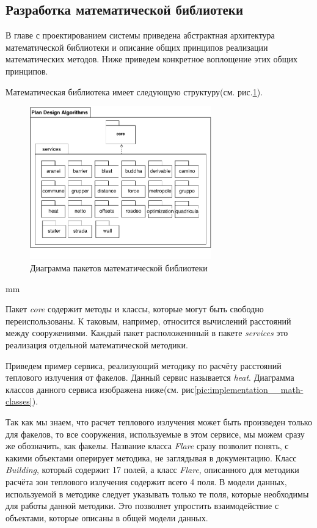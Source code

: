 \subsection{\large{Разработка математической библиотеки}}

В главе с проектированием системы приведена абстрактная архитектура математической библиотеки
и описание общих принципов реализации математических методов. Ниже приведем конкретное воплощение этих общих принципов.

Математическая библиотека имеет следующую структуру(см. рис.\ref{pic:implementation__math-packages}).

\begin{figure}[H]
	\includegraphics[width=0.7\textwidth]{implementation/pictures/math/packages}
	\caption{Диаграмма пакетов математической библиотеки}
	\label{pic:implementation__math-packages}
\end{figure}
 mm

Пакет \textit{core} содержит методы и классы, которые могут быть свободно переиспользованы.
К таковым, например, относится вычислений расстояний между сооружениями.
Каждый пакет расположеннный в пакете \textit{services} это реализация отдельной математической методики.

Приведем пример сервиса, реализующий
методику по расчёту расстояний теплового излучения от факелов. Данный сервис называется \textit{heat}.
Диаграмма классов данного сервиса изображена ниже(см. рис\ref{pic:implementation__math-classes}).

Так как мы знаем, что расчет теплового излучения может быть произведен только для факелов, то все сооружения,
используемые в этом сервисе, мы можем сразу же обозначить, как факелы. Название класса \textit{Flare} сразу позволит
понять, с какими объектами оперирует методика, не заглядывая в документацию.
Класс \textit{Building}, который содержит 17 полей, а класс \textit{Flare}, описанного для методики расчёта
зон теплового излучения содержит всего 4 поля. В модели данных, используемой в методике следует указывать только те поля,
которые необходимы для работы данной методики. Это позволяет упростить взаимодействие с объектами, которые
описаны в общей модели данных.

